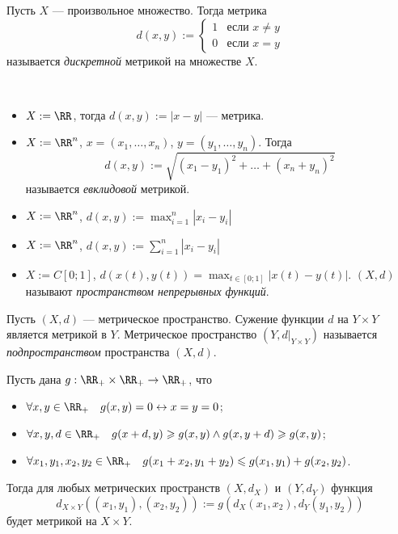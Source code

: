 \documentclass[12pt,a4paper]{article}
\begin{document}
    \begin{example}
        Пусть $X$ --- произвольное множество. Тогда метрика
        \[
            d(x, y) := 
                \begin{cases}
                    1& \text{если $x \neq y$}\\
                    0& \text{если $x = y$}
                \end{cases}
        \]
        называется \emph{дискретной} метрикой на множестве $X$.
    \end{example}

    \begin{example}\ 
        \begin{itemize}
            \item $X := \RR$, тогда $d(x, y) := |x-y|$ --- метрика.
            \item $X := \RR^n$, $x = (x_1, \dots, x_n)$, $y = (y_1, \dots, y_n)$. Тогда
                \[d(x, y) := \sqrt{(x_1 - y_1)^2 + \dots + (x_n + y_n)^2}\]
                называется \emph{евклидовой} метрикой.
            \item $X := \RR^n$, $d(x, y) := \max_{i = 1}^n |x_i - y_i|$
            \item $X := \RR^n$, $d(x, y) := \sum_{i = 1}^n |x_i - y_i|$
            \item $X := C[0; 1]$, $d(x(t), y(t)) = \max_{t \in [0; 1]} |x(t) - y(t)|$. $(X, d)$ называют \emph{пространством непрерывных функций}.
        \end{itemize}
    \end{example}

    \begin{definition}
        Пусть $(X, d)$ --- метрическое пространство. Сужение функции $d$ на $Y \times Y$ является метрикой в $Y$. Метрическое пространство $(Y, d|_{Y\times Y})$ называется \emph{подпространством} пространства $(X, d)$.
    \end{definition}

    \begin{theorem}\label{generalised_metric_spaces_multiplication_theorem}
        Пусть дана $g: \RR_+ \times \RR_+ \to \RR_+$, что
        \begin{itemize}
            \item $\forall x, y \in \RR_+\quad g(x, y) = 0 \leftrightarrow x = y = 0$;
            \item $\forall x, y, d \in \RR_+\quad g(x + d, y) \geqslant g(x, y) \wedge g(x, y + d) \geqslant g(x, y)$;
            \item $\forall x_1, y_1, x_2, y_2 \in \RR_+ \quad g(x_1 + x_2, y_1 + y_2) \leqslant g(x_1, y_1) + g(x_2, y_2)$.
        \end{itemize}
        Тогда для любых метрических пространств $(X, d_X)$ и $(Y, d_Y)$ функция
        \[d_{X \times Y}((x_1, y_1), (x_2, y_2)) := g(d_X(x_1, x_2), d_Y(y_1, y_2))\]
        будет метрикой на $X \times Y$.
    \end{theorem}
\end{document}
